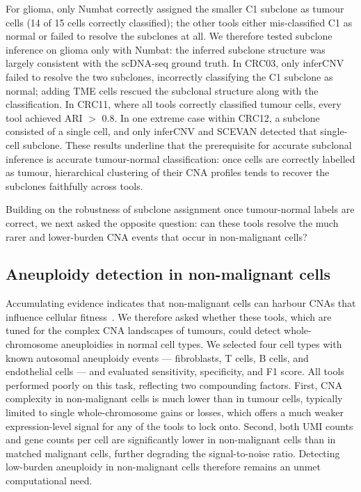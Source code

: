 \documentclass[11pt]{article}
\begin{document}
For glioma, only Numbat correctly assigned the smaller C1 subclone as tumour
cells (14 of 15 cells correctly classified); the other tools either
mis-classified C1 as normal or failed to resolve the subclones at all. We
therefore tested subclone inference on glioma only with Numbat: the
inferred subclone structure was largely consistent with the scDNA-seq ground
truth. In CRC03, only inferCNV failed to resolve the two subclones,
incorrectly classifying the C1 subclone as normal; adding TME cells rescued
the subclonal structure along with the classification. In CRC11, where all
tools correctly classified tumour cells, every tool achieved ARI $>$ 0.8.
In one extreme case within CRC12, a subclone consisted of a single cell, and
only inferCNV and SCEVAN detected that single-cell subclone. These results
underline that the prerequisite for accurate subclonal inference is accurate
tumour-normal classification: once cells are correctly labelled as tumour,
hierarchical clustering of their CNA profiles tends to recover the subclones
faithfully across tools.

Building on the robustness of subclone assignment once tumour-normal
labels are correct, we next asked the opposite question: can these tools
resolve the much rarer and lower-burden CNA events that occur in
non-malignant cells?

\subsection{Aneuploidy detection in non-malignant cells}

Accumulating evidence indicates that non-malignant cells can harbour CNAs
that influence cellular fitness~\cite{zhou2020singlecell}. We therefore
asked whether these tools, which are tuned for the complex CNA landscapes
of tumours, could detect whole-chromosome aneuploidies in normal cell types.
We selected four cell types with known autosomal aneuploidy events ---
fibroblasts, T cells, B cells, and endothelial cells --- and evaluated
sensitivity, specificity, and F1 score. All tools performed poorly on this
task, reflecting two compounding factors. First, CNA complexity in
non-malignant cells is much lower than in tumour cells, typically limited to
single whole-chromosome gains or losses, which offers a much weaker
expression-level signal for any of the tools to lock onto. Second, both UMI
counts and gene counts per cell are significantly lower in non-malignant
cells than in matched malignant cells, further degrading the
signal-to-noise ratio. Detecting low-burden aneuploidy in non-malignant
cells therefore remains an unmet computational need.
\end{document}
